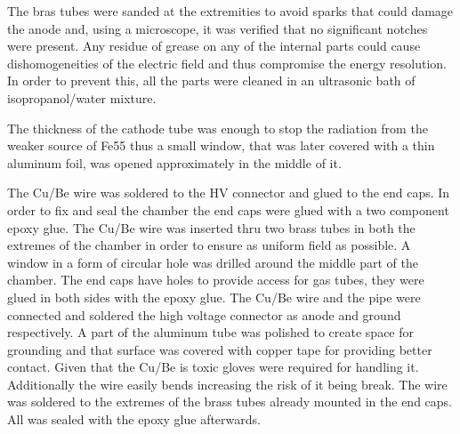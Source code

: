 The bras tubes were sanded at the extremities to avoid sparks that could damage
the anode and, using a microscope, it was verified that no significant notches
were present. Any residue of grease on any of the internal parts could cause
dishomogeneities of the electric field and thus compromise the energy
resolution. In order to prevent this, all the parts were cleaned in an
ultrasonic bath of isopropanol/water mixture.

The thickness of the cathode tube was enough to stop the radiation from the
weaker source of Fe55 thus a small window, that was later covered with a thin
aluminum foil, was opened approximately in the middle of it.

The Cu/Be wire was soldered to the HV connector and glued to the end caps. In
order to fix and seal the chamber the end caps were glued with a two component
epoxy glue.  The Cu/Be wire was inserted thru two brass tubes in both the
extremes of the chamber in order to ensure as uniform field as possible.  A
window in a form of circular hole was drilled around the middle part of the
chamber. The end caps have holes to provide access for gas tubes, they were
glued in both sides with the epoxy glue.  The Cu/Be wire and the pipe were
connected and soldered the high voltage connector as anode and ground
respectively. A part of the aluminum tube was polished to create space for
grounding and that surface was covered with copper tape for providing better
contact.  Given that the Cu/Be is toxic gloves were required for handling it.
Additionally the wire easily bends increasing the risk of it being break. The
wire was soldered to the extremes of the brass tubes already mounted in the end
caps. All was sealed with the epoxy glue afterwards.

